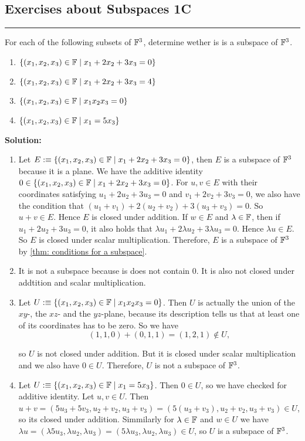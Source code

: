 \subsection*{Exercises about Subspaces 1C}
\hrule
\phantom{.}

\begin{xrcs}
  For each of the following subsets of $\mathbb{F}^3$, determine wether is is a subspace of $\mathbb{F}^3$.
  \begin{enumerate}
    \item $\{(x_1, x_2, x_3) \in \mathbb{F} \mid x_1 + 2x_2 + 3 x_3 = 0\}$
    \item $\{(x_1, x_2, x_3) \in \mathbb{F} \mid x_1 + 2x_2 + 3 x_3 = 4\}$
    \item $\{(x_1, x_2, x_3) \in \mathbb{F} \mid x_1 x_2 x_3 = 0\}$
    \item $\{(x_1, x_2, x_3) \in \mathbb{F} \mid x_1 = 5x_3\}$
  \end{enumerate}
\end{xrcs}
\textbf{Solution:}
\begin{enumerate}
  \item Let $E :\equiv \{(x_1, x_2, x_3) \in \mathbb{F} \mid x_1 + 2x_2 + 3 x_3 = 0\}$, then $E$ is a subspace of $\mathbb{F}^3$ because it is a plane. We have the additive identity  $0 \in \{(x_1, x_2, x_3) \in \mathbb{F} \mid x_1 + 2x_2 + 3 x_3 = 0\}$. For $u,v \in E$ with their coordinates satisfying $u_1 + 2u_2 + 3u_3 = 0$ and $v_1 + 2v_2 + 3v_3 = 0$, we also have the condition that $(u_1 + v_1) + 2 (u_2 + v_2) + 3(u_3 + v_3)= 0$. So $u+v \in E$. Hence $E$ is closed under addition. If $w \in E$ and $\lambda \in \mathbb{F}$, then if $u_1 + 2u_2 + 3u_3 = 0$, it also holds that $\lambda u_1 + 2\lambda u_2 + 3\lambda u_3 = 0$. Hence $\lambda u \in E$. So $E$ is closed under scalar multiplication. Therefore, $E$ is a subspace of $\mathbb{F}^3$ by \ref{thm: conditions for a subspace}.

  \item It is not a subspace because is does not contain $0$. It is also not closed under addtition and scalar multiplication.

  \item Let $U :\equiv \{(x_1, x_2, x_3) \in \mathbb{F} \mid x_1 x_2 x_3 = 0\}$. Then $U$ is actually the union of the $xy$-, the $xz$- and the $yz$-plane, because its description tells us that at least one of its coordinates has to be zero. So we have
  \[
    (1,1,0) + (0,1,1) = (1,2,1) \notin U,
  \]

  so $U$ is not closed under addition. But it is closed under scalar multiplication and we also have $0 \in U$. Therefore, $U$ is not a subspace of $\mathbb{F}^3$.

  \item Let $U :\equiv \{(x_1, x_2, x_3) \in \mathbb{F} \mid x_1 = 5x_3\}$. Then $0 \in U$, so we have checked for additive identity. Let $u,v \in U$. Then $u+v= (5u_3+5v_3, u_2+v_2, u_3+v_3) = (5(u_3+v_3), u_2+v_2, u_3+v_3) \in U$, so its closed under addition. Simmilarly for $\lambda \in \mathbb{F}$ and $w \in U$ we have $\lambda u = (\lambda 5u_3, \lambda u_2, \lambda u_3) = (5 \lambda u_3, \lambda u_2, \lambda u_3) \in U$, so $U$ is a subspace of $\mathbb{F}^3$.
\end{enumerate}

